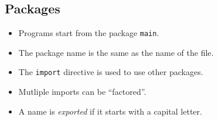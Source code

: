 \subsection{Packages}
\begin{itemize}
\item Programs start from the package \texttt{main}. 
\item The package name is the same as the name of the file.
\item The \texttt{import} directive is used to use other packages.
\item Mutliple imports can be ``factored''.
\item A name is \textit{exported} if it starts with a capital letter.
\end{itemize}


